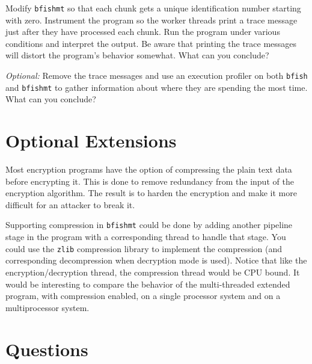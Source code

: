 \documentclass[twocolumn]{article}
\newcommand{\filename}[1]{\texttt{#1}}
\begin{document}
Modify \filename{bfishmt} so that each chunk gets a unique identification number starting with
zero. Instrument the program so the worker threads print a trace message just after they have
processed each chunk. Run the program under various conditions and interpret the output. Be
aware that printing the trace messages will distort the program's behavior somewhat. What can
you conclude?

\textit{Optional:} Remove the trace messages and use an execution profiler on both
\filename{bfish} and \filename{bfishmt} to gather information about where they are spending the
most time. What can you conclude?

\section{Optional Extensions}

Most encryption programs have the option of compressing the plain text data before encrypting
it. This is done to remove redundancy from the input of the encryption algorithm. The result is
to harden the encryption and make it more difficult for an attacker to break it.

Supporting compression in \filename{bfishmt} could be done by adding another pipeline stage in
the program with a corresponding thread to handle that stage. You could use the \filename{zlib}
compression library to implement the compression (and corresponding decompression when
decryption mode is used). Notice that like the encryption/decryption thread, the compression
thread would be CPU bound. It would be interesting to compare the behavior of the multi-threaded
extended program, with compression enabled, on a single processor system and on a multiprocessor
system.

\section{Questions}
\end{document}
